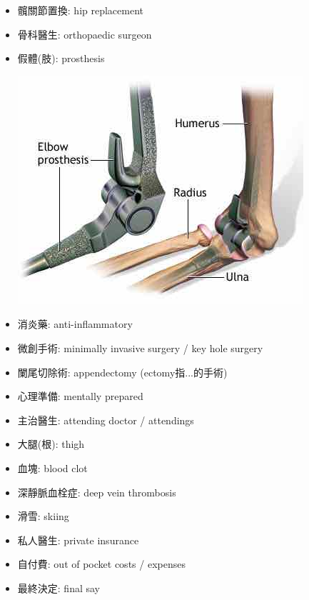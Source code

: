\begin{multicols}{2}
\begin{itemize}
  \itemsep0em
  \item 髖關節置換: hip replacement
  \item 骨科醫生: orthopaedic surgeon
  \item 假體(肢): prosthesis
  \begin{center}
    \includegraphics[scale=.5]{pics/prosthesis}
  \end{center}
  \item 消炎藥: anti-inflammatory
  \item 微創手術: minimally invasive surgery / key hole surgery
  \item 闌尾切除術: appendectomy (ectomy指...的手術)
  \item 心理準備: mentally prepared
  \item 主治醫生: attending doctor / attendings
  \item 大腿(根): thigh
  \item 血塊: blood clot
  \item 深靜脈血栓症: deep vein thrombosis
  \item 滑雪: skiing
  \item 私人醫生: private  insurance
  \item 自付費: out of pocket costs / expenses
  \item 最終決定: final say
\end{itemize}
\end{multicols}

